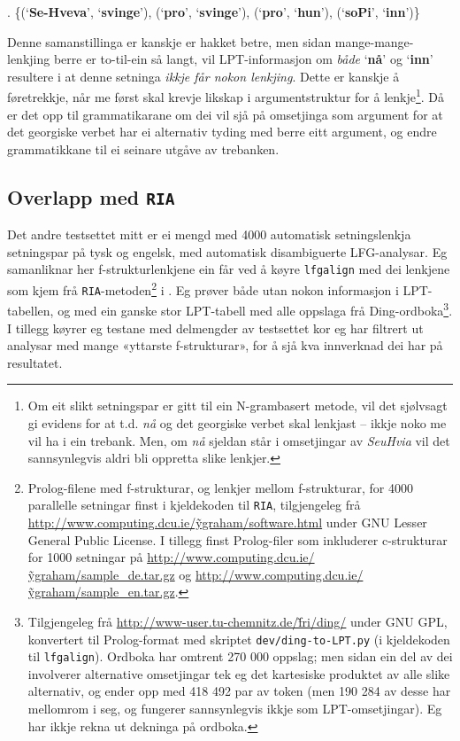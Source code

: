 \documentclass[12pt,a4paper,oneside,draft]{report}
\newcommand{\p}[1]{`\textbf{#1}'}
\begin{document}
\ex. \{(\p{Se-Hveva}, \p{svinge}), (\p{pro}, \p{svinge}), (\p{pro}, \p{hun}), (\p{soPi}, \p{inn})\}

Denne samanstillinga er kanskje er hakket betre, men sidan
mange-mange-lenkjing berre er to-til-ein så langt, vil LPT-informasjon
om \emph{både} \p{nå} og \p{inn} resultere i at denne setninga \emph{ikkje får nokon lenkjing}. Dette er kanskje å føretrekkje, når me først skal
krevje likskap i argumentstruktur for å lenkje\footnote{Om eit slikt setningspar er gitt til ein N-grambasert metode,
        vil det sjølvsagt gi evidens for at t.d. \emph{nå} og det georgiske
        verbet skal lenkjast -- ikkje noko me vil ha i ein
        trebank. Men, om \emph{nå} sjeldan står i omsetjingar av \emph{SeuHvia}
        vil det sannsynlegvis aldri bli oppretta slike lenkjer. }. Då er det opp
til grammatikarane om dei vil sjå på omsetjinga som argument for at
det georgiske verbet har ei alternativ tyding med berre eitt argument,
og endre grammatikkane til ei seinare utgåve av trebanken.


\subsection{Overlapp med \texttt{RIA}}
\label{sec-5.3.2}

\label{SEC:ria}

Det andre testsettet mitt er ei mengd med 4000 automatisk
 setningslenkja setningspar på tysk og engelsk, med automatisk
 disambiguerte LFG-analysar. Eg samanliknar her f-strukturlenkjene ein
 får ved å køyre \texttt{lfgalign} med dei lenkjene som kjem frå
 \texttt{RIA}-metoden\footnote{Prolog-filene med f-strukturar, og lenkjer mellom
        f-strukturar, for 4000 parallelle setningar finst i
        kjeldekoden til \texttt{RIA}, tilgjengeleg frå
        \href{http://www.computing.dcu.ie/~ygraham/software.html}{http://www.computing.dcu.ie/\~ygraham/software.html} under GNU
        Lesser General Public License. I tillegg finst Prolog-filer
        som inkluderer c-strukturar for 1000 setningar på
        \href{http://www.computing.dcu.ie/~ygraham/sample_de.tar.gz}{http://www.computing.dcu.ie/\~ygraham/sample\_de.tar.gz} og
        \href{http://www.computing.dcu.ie/~ygraham/sample_en.tar.gz}{http://www.computing.dcu.ie/\~ygraham/sample\_en.tar.gz}. } i \citet{graham2009osr,graham2009fts}. Eg prøver
 både utan nokon informasjon i LPT-tabellen, og med ein ganske stor
 LPT-tabell med alle oppslaga frå Ding-ordboka\footnote{Tilgjengeleg frå \href{http://www-user.tu-chemnitz.de/~fri/ding/}{http://www-user.tu-chemnitz.de/\~fri/ding/}
        under GNU GPL, konvertert til Prolog-format med skriptet
        \texttt{dev/ding-to-LPT.py} (i kjeldekoden til \texttt{lfgalign}).  Ordboka
        har omtrent 270 000 oppslag; men sidan ein del av dei
        involverer alternative omsetjingar tek eg det kartesiske
        produktet av alle slike alternativ, og ender opp med 418 492
        par av token (men 190 284 av desse har mellomrom i seg, og
        fungerer sannsynlegvis ikkje som LPT-omsetjingar). Eg har
        ikkje rekna ut dekninga på ordboka. }. I tillegg
 køyrer eg testane med delmengder av testsettet kor eg har filtrert ut
 analysar med mange «yttarste f-strukturar», for å sjå kva innverknad
 dei har på resultatet.
\end{document}
